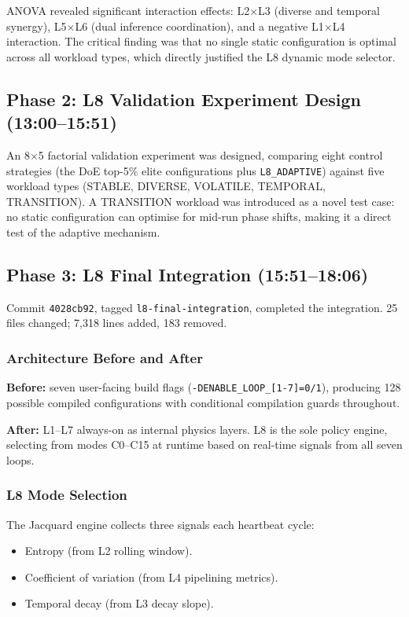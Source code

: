 ANOVA revealed significant interaction effects: L2$\times$L3 (diverse and
temporal synergy), L5$\times$L6 (dual inference coordination), and a
negative L1$\times$L4 interaction. The critical finding was that no single
static configuration is optimal across all workload types, which directly
justified the L8 dynamic mode selector.

\subsection{Phase 2: L8 Validation Experiment Design (13:00--15:51)}

An 8$\times$5 factorial validation experiment was designed, comparing eight
control strategies (the DoE top-5\% elite configurations plus
\texttt{L8\_ADAPTIVE}) against five workload types (STABLE, DIVERSE,
VOLATILE, TEMPORAL, TRANSITION). A TRANSITION workload was introduced as a
novel test case: no static configuration can optimise for mid-run phase
shifts, making it a direct test of the adaptive mechanism.

\subsection{Phase 3: L8 Final Integration (15:51--18:06)}

Commit \texttt{4028cb92}, tagged \texttt{l8-final-integration}, completed
the integration. 25 files changed; 7,318 lines added, 183 removed.

\subsubsection{Architecture Before and After}

\textbf{Before:} seven user-facing build flags
(\texttt{-DENABLE\_LOOP\_[1-7]=0/1}), producing 128 possible compiled
configurations with conditional compilation guards throughout.

\textbf{After:} L1--L7 always-on as internal physics layers. L8 is the
sole policy engine, selecting from modes C0--C15 at runtime based on
real-time signals from all seven loops.

\subsubsection{L8 Mode Selection}

The Jacquard engine collects three signals each heartbeat cycle:

\begin{itemize}
  \item Entropy (from L2 rolling window).
  \item Coefficient of variation (from L4 pipelining metrics).
  \item Temporal decay (from L3 decay slope).
\end{itemize}

